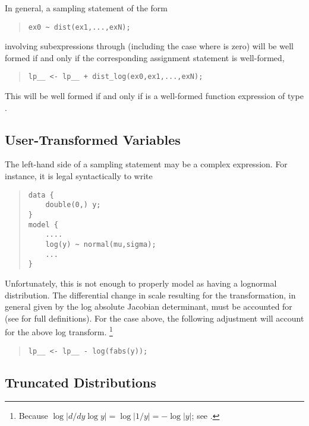 In general, a sampling statement of the form
%
\begin{quote}
\begin{Verbatim}
ex0 ~ dist(ex1,...,exN);
\end{Verbatim}
\end{quote}
%
involving subexpressions  through  (including the
case where  is zero) will be well formed if and only if the
corresponding assignment statement is well-formed,
%
\begin{quote}
\begin{Verbatim}
lp__ <- lp__ + dist_log(ex0,ex1,...,exN);
\end{Verbatim}
\end{quote}
%
This will be well formed if and only if
 is a well-formed function expression
of type .

\subsection{User-Transformed Variables}

The left-hand side of a sampling statement may be a complex
expression.  For instance, it is legal syntactically to write
%
\begin{quote}
\begin{Verbatim}
data {
    double(0,) y;
}
model {
    ....
    log(y) ~ normal(mu,sigma);
    ...
}
\end{Verbatim}
\end{quote}
%
Unfortunately, this is not enough to properly model  as having
a lognormal distribution.  The differential change in scale resulting
for the transformation, in general given by the log absolute Jacobian
determinant, must be accounted for (see
 for full definitions).  For the case
above, the following adjustment will account for the above log
transform.%
%
\footnote{Because $\log | d/dy \log y | = \log | 1/y | = - \log
  |y|$;  see .}
%
\begin{quote}
\begin{Verbatim}
lp__ <- lp__ - log(fabs(y));
\end{Verbatim}
\end{quote}
%

\subsection{Truncated Distributions}

